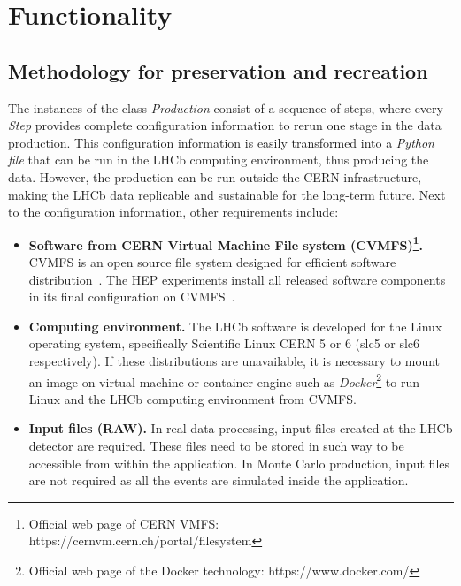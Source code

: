 \section{Functionality}

\subsection{Methodology for preservation and recreation}

The instances of the class {\it Production} consist of a sequence of steps, where every {\it Step} provides complete configuration information to rerun one stage in the data production. This configuration information is easily transformed into a \emph{Python file} that can be run in the LHCb computing environment, thus producing the data. However, the production can be run outside the CERN infrastructure, making the LHCb data replicable and sustainable for the long-term future. Next to the configuration information, other requirements include:
\begin{itemize}
    \item {\bf Software from CERN Virtual Machine File system (CVMFS)\footnote{Official web page of CERN VMFS: https://cernvm.cern.ch/portal/filesystem}.} CVMFS is an open  source file system designed for efficient software distribution~\cite{buncic2010cernvm}. The HEP experiments install all released software components in its final configuration on CVMFS~\cite{shiers2016cern}. 
    \item {\bf Computing environment.} The LHCb software is developed for the Linux operating system, specifically Scientific Linux CERN 5 or 6 (slc5 or slc6 respectively). If these distributions are unavailable, it is necessary to mount an image on virtual machine or container engine such as \emph{Docker}\footnote{Official web page of the Docker technology: https://www.docker.com/} to run Linux and the LHCb computing environment from CVMFS.
    \item {\bf Input files (RAW).} In real data processing, input files created at the LHCb detector are required. These files need to be stored in such way to be accessible from within the application. In Monte Carlo production, input files are not required as all the events are simulated inside the application.
\end{itemize}


